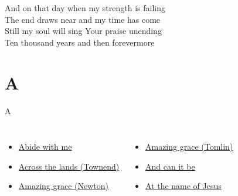 \documentclass{beamer}
\begin{document}
{\begin{frame}{}
\end{frame}

\hypertarget{10,000 reasons['Bless the Lord, O my soul']3}{}
\begin{frame}{}
\fontsize{ 15 }{ 19 }\selectfont

And on that day when my strength is failing\\ 
The end draws near and my time has come\\ 
Still my soul will sing Your praise unending\\ 
Ten thousand years and then forevermore 

\end{frame}

}
\section{A}

\begin{frame}{A}
\begin{columns}
    \begin{itemize}
    \item \hyperlink{Abide with me[]1}{Abide with me }
    \item \hyperlink{Across the lands["You're the Word of God the Father"](Townend)1}{Across the lands (Townend)}
    \item \hyperlink{Amazing grace[](Newton)1}{Amazing grace (Newton)}
\end{itemize}
    \begin{itemize}
    \item \hyperlink{Amazing grace['My chains are gone'](Tomlin)1}{Amazing grace (Tomlin)}
    \item \hyperlink{And can it be[]1}{And can it be }
    \item \hyperlink{At the name of Jesus[]1}{At the name of Jesus }
\end{itemize}


\end{columns}

\end{frame}
\end{document}
